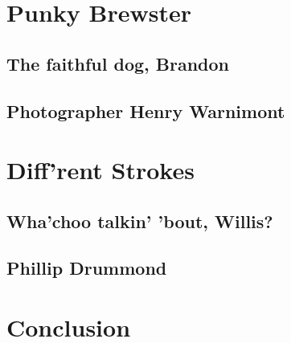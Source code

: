 
\section{Punky Brewster}

\subsection{The faithful dog, Brandon}

\subsection{Photographer Henry Warnimont}

\section{Diff'rent Strokes}

\subsection{Wha'choo talkin' 'bout, Willis?}

\subsection{Phillip Drummond}

\section{Conclusion}

